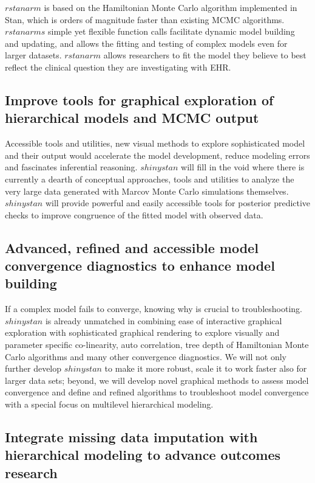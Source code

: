 \documentclass[11pt,notitlepage]{article}
\begin{document}
$rstanarm$ is based on the Hamiltonian Monte Carlo algorithm implemented in Stan, which is orders of magnitude faster than existing MCMC algorithms. $rstanarms$ simple yet flexible function calls facilitate dynamic model building and updating, and allows the fitting and testing of complex models even for larger datasets. $rstanarm$ allows researchers to fit the model they believe to best reflect the clinical question they are investigating with EHR.

\subsection*{Improve tools for graphical exploration of hierarchical models and MCMC output}

Accessible tools and utilities, new visual methods to explore sophisticated model and their output would accelerate the model development, reduce modeling errors and fascinates inferential reasoning. $shinystan$ will fill in the void where there is currently a dearth of conceptual approaches, tools and utilities to analyze the very large data generated with Marcov Monte Carlo simulations themselves. $shinystan$ will provide powerful and easily accessible tools for posterior predictive checks to improve congruence of the fitted model with observed data. 
 
\subsection*{Advanced, refined and accessible model convergence diagnostics to enhance model building} 

If a complex model fails to converge, knowing why is crucial to troubleshooting. $shinystan$ is already unmatched in combining ease of interactive graphical exploration with sophisticated graphical rendering to explore visually and parameter specific co-linearity, auto correlation, tree depth of Hamiltonian Monte Carlo algorithms and many other convergence diagnostics. We will not only further develop $shinystan$ to make it more robust, scale it to work faster also for larger data sets; beyond, we will develop novel graphical methods to assess model convergence and define and refined algorithms to troubleshoot model convergence with a special focus on multilevel hierarchical modeling. 

\subsection*{Integrate missing data imputation with hierarchical modeling to advance outcomes research}
\end{document}

